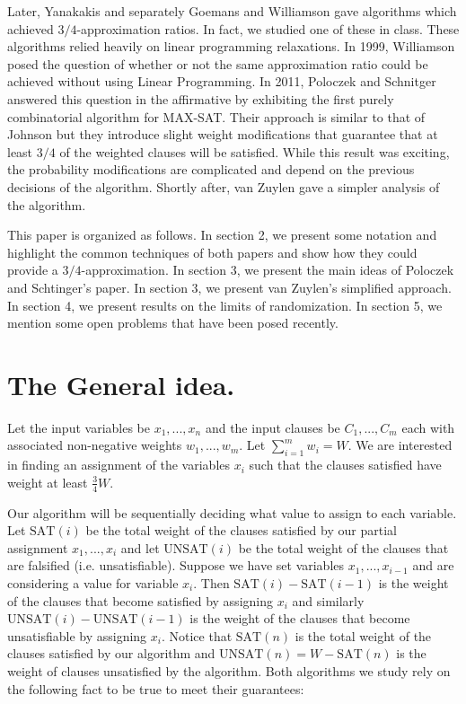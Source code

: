 \documentclass[11pt,letter]{article}
\begin{document}
Later, Yanakakis \cite{Yannakakis1994475} and separately Goemans and Williamson \cite{Goemans94new3/4-approximation} 
gave algorithms which achieved $3/4$-approximation ratios. In fact, we studied one of these in class. 
These algorithms relied heavily on linear programming relaxations. In 1999, Williamson posed the question 
of whether or not the same approximation ratio could be achieved without using Linear Programming. In 2011, 
Poloczek and Schnitger \cite{Poloczek:2011:RVJ:2133036.2133087} answered this question in the affirmative 
by exhibiting the first purely combinatorial algorithm for MAX-SAT. Their approach is similar to that of Johnson 
but they introduce slight weight modifications that guarantee that at least $3/4$ of the weighted clauses will be satisfied.
 While this result was exciting, the probability modifications are complicated and depend on the previous decisions
  of the algorithm. Shortly after, van Zuylen \cite{vanZuylen:2011:SAM:2238496.2238512} gave a simpler analysis of the algorithm. 

This paper is organized as follows. In section 2, we present some notation and highlight the common techniques of both papers 
and show how they could provide a $3/4$-approximation. In section 3, we present the main ideas 
of Poloczek and Schtinger's paper. In section 3, we present van Zuylen's simplified approach. 
In section 4, we present results on the limits of randomization. 
In section 5, we mention some open problems that have been posed recently.

\section{The General idea.} 

Let the input variables be $x_1,...,x_n$ and the input clauses be $C_1,...,C_m$ 
each with associated non-negative weights $w_1,...,w_m$. Let $\sum_{i=1}^{m} w_i = W$. 
We are interested in finding an assignment of the variables $x_i$ such that the clauses satisfied have weight at least $\frac{3}{4}W$. 

Our algorithm will be sequentially deciding what value to assign to each variable. Let $\text{SAT}(i)$ be the total weight of the clauses
satisfied by our partial assignment $x_1, ..., x_i$ and let $\text{UNSAT}(i)$ be the total weight of the clauses that are falsified (i.e. unsatisfiable).
Suppose we have set variables $x_1,...,x_{i-1}$ and are considering a value for variable $x_i$. Then $\text{SAT}(i)-\text{SAT}(i-1)$ is the weight 
of the clauses that become satisfied by assigning $x_i$ and similarly $\text{UNSAT}(i) - \text{UNSAT}(i-1)$ is the weight of the clauses that become
unsatisfiable by assigning $x_i$. 
Notice that $\text{SAT}(n)$ is the total weight of the clauses satisfied by our algorithm and $\text{UNSAT}(n) = W - \text{SAT}(n)$ is the weight of clauses 
unsatisfied by the algorithm. Both algorithms we study rely on the following fact to be true to meet their guarantees: 
\end{document}
